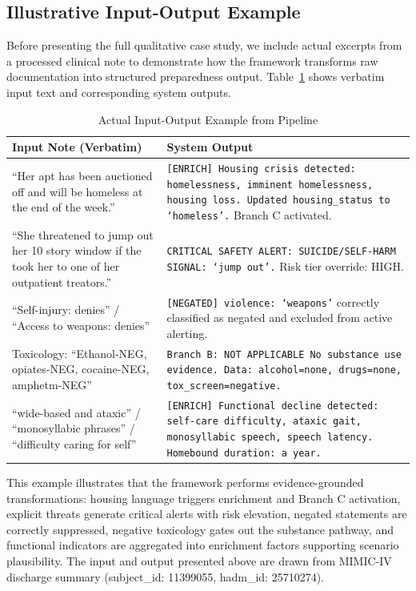 \documentclass[conference]{IEEEtran}
\begin{document}
\subsection{Illustrative Input-Output Example}

Before presenting the full qualitative case study, we include actual excerpts from a processed clinical note to demonstrate how the framework transforms raw documentation into structured preparedness output. Table~\ref{tab:mini_example} shows verbatim input text and corresponding system outputs.

\begin{table}[h]
\caption{Actual Input-Output Example from Pipeline}
\label{tab:mini_example}
\centering
\small
\begin{tabular}{@{}p{3.2cm}p{4.4cm}@{}}
\toprule
\textbf{Input Note (Verbatim)} & \textbf{System Output} \\
\midrule
``Her apt has been auctioned off and will be homeless at the end of the week.'' & \texttt{[ENRICH] Housing crisis detected: homelessness, imminent homelessness, housing loss. Updated housing\_status to `homeless'.} Branch C activated. \\
\midrule
``She threatened to jump out her 10 story window if the took her to one of her outpatient treators.'' & \texttt{CRITICAL SAFETY ALERT: SUICIDE/SELF-HARM SIGNAL: `jump out'.} Risk tier override: HIGH. \\
\midrule
``Self-injury: denies'' / ``Access to weapons: denies'' & \texttt{[NEGATED] violence: `weapons'}   correctly classified as negated and excluded from active alerting. \\
\midrule
Toxicology: ``Ethanol-NEG, opiates-NEG, cocaine-NEG, amphetm-NEG'' & \texttt{Branch B: NOT APPLICABLE   No substance use evidence. Data: alcohol=none, drugs=none, tox\_screen=negative.} \\
\midrule
``wide-based and ataxic'' / ``monosyllabic phrases'' / ``difficulty caring for self'' & \texttt{[ENRICH] Functional decline detected: self-care difficulty, ataxic gait, monosyllabic speech, speech latency. Homebound duration: a year.} \\
\bottomrule
\end{tabular}
\end{table}

This example illustrates that the framework performs evidence-grounded transformations: housing language triggers enrichment and Branch C activation, explicit threats generate critical alerts with risk elevation, negated statements are correctly suppressed, negative toxicology gates out the substance pathway, and functional indicators are aggregated into enrichment factors supporting scenario plausibility. The input and output presented above are drawn from MIMIC-IV discharge summary (subject\_id: 11399055, hadm\_id: 25710274).
\end{document}
